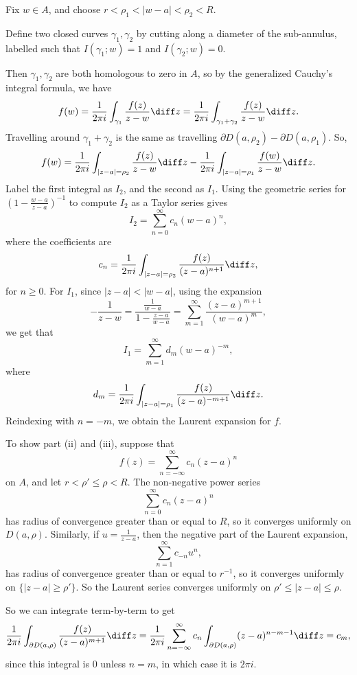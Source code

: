\documentclass[12pt]{article}
\begin{document}
\begin{proofbox}
	Fix $w \in A$, and choose $r < \rho_1 < |w-a| < \rho_2 < R$.

	Define two closed curves $\gamma_1, \gamma_2$ by cutting along a diameter of the sub-annulus, labelled such that $I(\gamma_1;w) = 1$ and $I(\gamma_2;w) = 0$.

	Then $\gamma_1, \gamma_2$ are both homologous to zero in $A$, so by the generalized Cauchy's integral formula, we have
	\[
	f(w) = \frac{1}{2 \pi i} \int_{\gamma_1} \frac{f(z)}{z - w} \diff z = \frac{1}{2 \pi i} \int_{\gamma_1 + \gamma_2} \frac{f(z)}{z - w} \diff z.
	\]
	Travelling around $\gamma_1 + \gamma_2$ is the same as travelling $\partial D(a, \rho_2) - \partial D(a, \rho_1)$. So,
	\[
	f(w) = \frac{1}{2 \pi i} \int_{|z - a| = \rho_2} \frac{f(z)}{z - w} \diff z - \frac{1}{2 \pi i} \int_{|z-a|=\rho_1} \frac{f(w)}{z - w} \diff z.
	\]
	Label the first integral as $I_2$, and the second as $I_1$. Using the geometric series for $(1 - \frac{w-a}{z-a})^{-1}$ to compute $I_2$ as a Taylor series gives
	\[
	I_2 = \sum_{n = 0}^{\infty} c_n (w - a)^{n},
	\]
	where the coefficients are
	\[
	c_n = \frac{1}{2 \pi i} \int_{|z - a| = \rho_2} \frac{f(z)}{(z - a)^{n+1}} \diff z,
	\]
	for $n \geq 0$. For $I_1$, since $|z-a| < |w-a|$, using the expansion
	\[
	-\frac{1}{z - w} = \frac{\frac{1}{w-a}}{1 - \frac{z-a}{w - a}} = \sum_{m = 1}^{\infty} \frac{(z - a)^{m+1}}{(w - a)^{m}},
	\]
	we get that
	\[
	I_1 = \sum_{m = 1}^{\infty} d_m (w - a)^{-m},
	\]
	where
	\[
	d_m = \frac{1}{2 \pi i} \int_{|z-a| = \rho_1} \frac{f(z)}{(z - a)^{-m+1}} \diff z.
	\]
	Reindexing with $n = -m$, we obtain the Laurent expansion for $f$.

	To show part (ii) and (iii), suppose that
	\[
	f(z) = \sum_{n = -\infty}^{\infty} c_n(z - a)^{n}
	\]
	on $A$, and let $r < \rho' \leq \rho < R$. The non-negative power series
	\[
	\sum_{n = 0}^{\infty}c_n (z - a)^{n}
	\]
	has radius of convergence greater than or equal to $R$, so it converges uniformly on $D(a, \rho)$. Similarly, if $u = \frac{1}{z - a}$, then the negative part of the Laurent expansion,
	\[
	\sum_{n = 1}^{\infty}c_{-n} u^{n},
	\]
	has radius of convergence greater than or equal to $r^{-1}$, so it converges uniformly on $\{|z - a| \geq \rho'\}$. So the Laurent series converges uniformly on $\rho' \leq |z - a| \leq \rho$.

	So we can integrate term-by-term to get
	\[
	\frac{1}{2 \pi i} \int_{\partial D(a, \rho)} \frac{f(z)}{(z - a)^{m+1}} \diff z = \frac{1}{2 \pi i} \sum_{n = -\infty}^{\infty} c_n \int_{\partial D(a, \rho)} (z - a)^{n - m - 1} \diff z = c_m,
	\]
	since this integral is $0$ unless $n = m$, in which case it is $2 \pi i$.
\end{proofbox}
\end{document}

